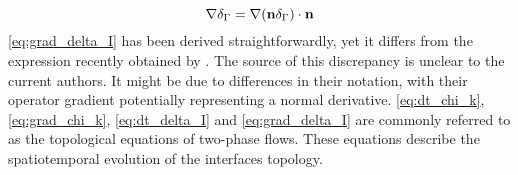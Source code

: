 
\begin{equation}
    \mathbf{\nabla}\delta_\Gamma  
    =   \mathbf{\nabla} (\textbf{n} \delta_\Gamma) \cdot \textbf{n}
    \label{eq:grad_delta_I}
\end{equation}
\ref{eq:grad_delta_I} has been derived straightforwardly, yet it differs from the expression recently obtained by \citet{orlando2023evolution}.  The source of this discrepancy is unclear to the current authors. 
It might be due to differences in their notation, with their operator gradient potentially representing a normal derivative. 
\ref{eq:dt_chi_k}, \ref{eq:grad_chi_k}, \ref{eq:dt_delta_I} and \ref{eq:grad_delta_I}  are commonly referred to as the topological equations of two-phase flows.
These equations describe the spatiotemporal evolution of the interfaces topology.

